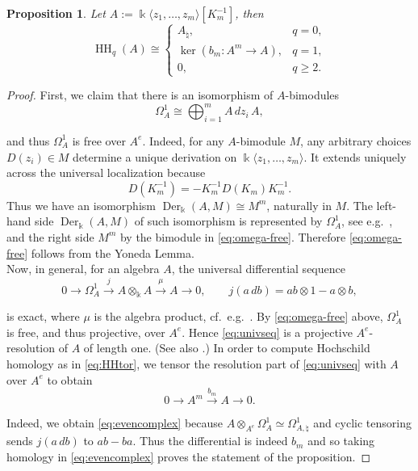 \documentclass[11pt]{article}
\newtheorem{proposition}[theorem]{Proposition}
\newcommand{\kk}{\Bbbk}
\newcommand{\HH}{\operatorname{HH}}
\newcommand{\Der}{\operatorname{Der}}
\newcommand{\Om}{\Omega}
\newcommand{\natq}{\natural}
\begin{document}
\begin{proposition}\label{prop:HH_even_case} Let $A:=\kk\langle z_1,\ldots,z_m\rangle[K_m^{-1}]$, then
\[
 \HH_q(A)\cong
 \begin{cases}
 A_\natq,&q=0,\\
 \ker(b_m:A^m\to A),&q=1,\\
 0,&q\ge2.
 \end{cases}
\]
\end{proposition}

\begin{proof}
First, we claim that there is an isomorphism of $A$-bimodules
\begin{equation}\label{eq:omega-free}
\Om^1_{A}\cong\bigoplus_{i=1}^m A\,dz_i\,A,
\end{equation}

and thus $\Om^1_A$ is free over $A^e$. Indeed, for any $A$-bimodule $M$, any arbitrary choices $D(z_i)\in M$ determine a
unique derivation on $\kk\langle z_1,\ldots,z_m\rangle$. It extends uniquely across the universal
localization because
\[
 D(K_m^{-1})=-K_m^{-1}D(K_m)K_m^{-1}.
\]
Thus we have an isomorphism $\Der_\kk(A,M)\cong M^m$, naturally in $M$.  The left-hand side $\Der_\kk(A,M)$ of such isomorphism is represented
by $\Om^1_A$, see e.g.~\cite[Section~2, Proposition~2.4]{CQ}, and the right side $M^m$ by the bimodule in \eqref{eq:omega-free}. Therefore \eqref{eq:omega-free} follows from the Yoneda Lemma.\\

Now, in general, for an algebra $A$, the universal differential sequence
\begin{equation}\label{eq:univseq}
0\longrightarrow\Om^1_A\xrightarrow{j}A\otimes_\kk A
\xrightarrow{\mu}A\longrightarrow0,
\qquad j(a\,db)=ab\otimes1-a\otimes b,
\end{equation}

is exact, where $\mu$ is the algebra product, cf.~e.g.~\cite[Proposition~2.5]{CQ}.  By 
\eqref{eq:omega-free} above, $\Om^1_A$ is free, and thus projective, over $A^e$. Hence \eqref{eq:univseq} is a projective $A^e$-resolution
of $A$ of length one. (See also \cite[Proposition~3.3]{CQ}.) In order to compute Hochschild homology as in \eqref{eq:HHtor}, we tensor the resolution part of \eqref{eq:univseq} with $A$ over
$A^e$ to obtain
\begin{equation}\label{eq:evencomplex}
0\longrightarrow A^m\xrightarrow{b_m}A\longrightarrow0.
\end{equation}

Indeed, we obtain \eqref{eq:evencomplex} because $A\otimes_{A^e}\Om^1_A\simeq\Om^1_{A,\natq}$ and cyclic tensoring sends
$j(a\,db)$ to $ab-ba$.  Thus the differential is indeed $b_m$ and so taking
homology in \eqref{eq:evencomplex} proves the statement of the proposition.
\end{proof}
\color{black}
\end{document}
